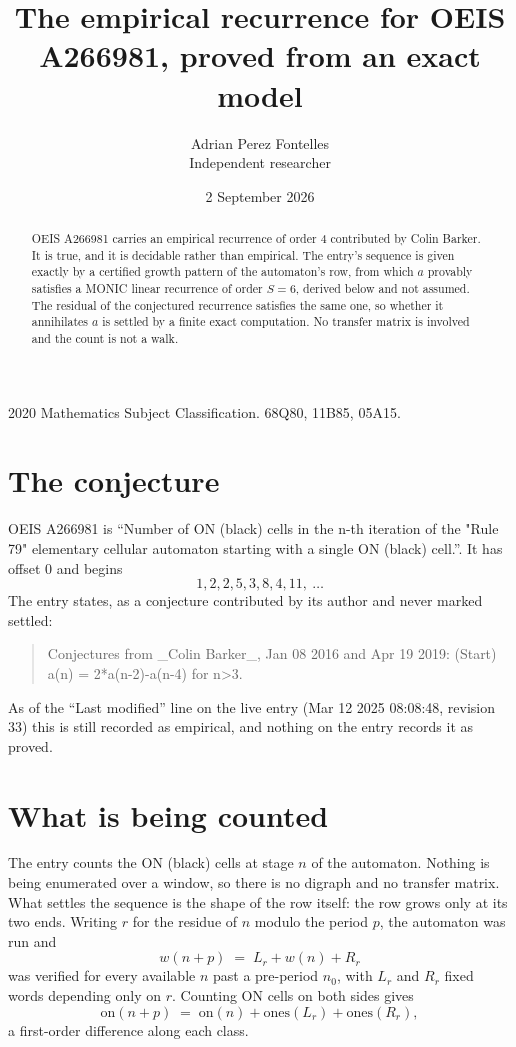 \documentclass[11pt,a4paper]{article}
\title{The empirical recurrence for OEIS A266981, proved from an exact model}
\author{Adrian Perez Fontelles\\ \small Independent researcher}
\date{2 September 2026}
\theoremstyle{plain}
\theoremstyle{definition}
\begin{document}
\maketitle

\begin{abstract}
OEIS A266981 carries an empirical recurrence of order $4$ contributed by Colin Barker. It is true, and it is
decidable rather than empirical. The entry's sequence is given exactly by a certified growth pattern of the automaton's row, from
which $a$ provably satisfies a MONIC linear recurrence of order $S=6$, derived below and not
assumed. The residual of the conjectured recurrence satisfies the same one, so whether it
annihilates $a$ is settled by a finite exact computation. No transfer matrix is involved and
the count is not a walk.
\end{abstract}

\noindent\small 2020 Mathematics Subject Classification. 68Q80, 11B85, 05A15.\normalsize

\section{The conjecture}

OEIS A266981 is ``Number of ON (black) cells in the n-th iteration of the "Rule 79" elementary cellular automaton starting with a single ON (black) cell.''. It has offset $0$ and begins
\[
1, 2, 2, 5, 3, 8, 4, 11,\ \dots
\]
The entry states, as a conjecture contributed by its author and never marked settled:
\begin{quote}
Conjectures from \_Colin Barker\_, Jan 08 2016 and Apr 19 2019: (Start) a(n) = 2*a(n-2)-a(n-4) for n>3.
\end{quote}
As of the ``Last modified'' line on the live entry (Mar 12 2025 08:08:48, revision 33)
this is still recorded as empirical, and nothing on the entry records it as proved.

\section{What is being counted}

The entry counts the ON (black) cells at stage $n$ of the automaton. Nothing is being enumerated over a window, so there is
no digraph and no transfer matrix. What settles the sequence is the shape of the row itself:
the row grows only at its two ends. Writing
$r$ for the residue of $n$ modulo the period $p$, the automaton was run and
\[
w(n+p)\;=\;L_r + w(n) + R_r
\]
was verified for every available $n$ past a
pre-period $n_0$, with $L_r$ and $R_r$ fixed words depending only on $r$. Counting ON cells on
both sides gives
\[
\mathrm{on}(n+p)\;=\;\mathrm{on}(n)+\mathrm{ones}(L_r)+\mathrm{ones}(R_r),
\]
a first-order difference along each class.
\end{document}
